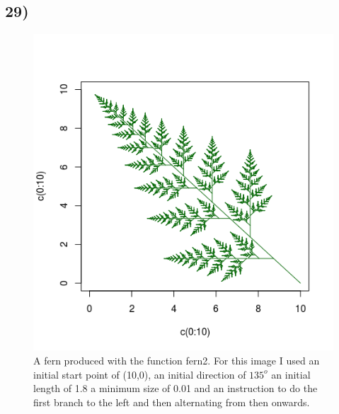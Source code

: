 \documentclass[11pt]{article}
\begin{document}
\subsection*{29)}
\begin{figure}[H]
\begin{center}
\includegraphics[scale=0.5]{../Results/Plots/Fern.png}
\caption{A fern produced with the function fern2. For this image I used an initial start point of (10,0), an initial direction of $135^{o}$ an initial length of 1.8 a minimum size of 0.01 and an instruction to do the first branch to the left and then alternating from then onwards.}
\end{center}
\end{figure}
\end{document}
